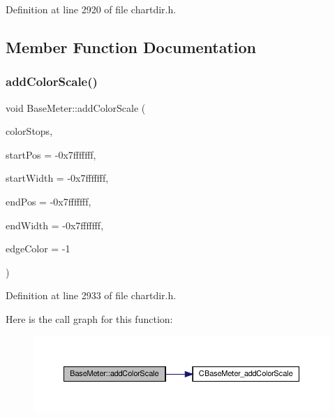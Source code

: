 Definition at line 2920 of file chartdir.\+h.



\subsection{Member Function Documentation}
\mbox{\label{class_base_meter_ac46f3e2cde5c00a129bb23097d77215d}} 
\subsubsection{\texorpdfstring{add\+Color\+Scale()}{addColorScale()}}
{\footnotesize\ttfamily void Base\+Meter\+::add\+Color\+Scale (\begin{DoxyParamCaption}\item[{\hyperlink{class_double_array}{Double\+Array}}]{color\+Stops,  }\item[{int}]{start\+Pos = {\ttfamily -\/0x7fffffff},  }\item[{int}]{start\+Width = {\ttfamily -\/0x7fffffff},  }\item[{int}]{end\+Pos = {\ttfamily -\/0x7fffffff},  }\item[{int}]{end\+Width = {\ttfamily -\/0x7fffffff},  }\item[{int}]{edge\+Color = {\ttfamily -\/1} }\end{DoxyParamCaption})\hspace{0.3cm}{\ttfamily [inline]}}



Definition at line 2933 of file chartdir.\+h.

Here is the call graph for this function\+:
\nopagebreak
\begin{figure}[H]
\begin{center}
\leavevmode
\includegraphics[width=350pt]{class_base_meter_ac46f3e2cde5c00a129bb23097d77215d_cgraph}
\end{center}
\end{figure}
\mbox{\label{class_base_meter_ac1509c1c45fab0484842553f81c97365}} 
